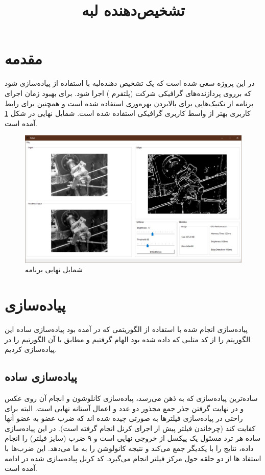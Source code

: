 \documentclass{article}
\title{تشخیص‌دهنده لبه}
\begin{document}
\heading
\header
\allowdisplaybreaks

\tableofcontents
\pagebreak

\section{مقدمه}
در این پروژه سعی شده است که یک تشخیص دهنده‌لبه
با استفاده از  پیاده‌سازی شود که برروی پردازنده‌های گرافیکی شرکت
 (پلتفرم ) اجرا شود.
برای بهبود زمان اجرای برنامه از تکنیک‌هایی برای بالابردن بهره‌وری استفاده شده است و همچنین
برای رابط کاربری بهتر از واسط کاربری گرافیکی استفاده‌ شده است.
شمایل نهایی در شکل \ref{fig:final} آمده است.

\begin{figure}
	\centering
	\includegraphics[scale=0.4]{./resources/final.jpg}
	\caption{شمایل نهایی برنامه}
	\label{fig:final}
\end{figure}

\section{پیاده‌سازی}
پیاده‌سازی انجام شده با استفاده از الگوریتمی که در 
\textcolor{cyan}{\href{https://en.wikipedia.org/wiki/Sobel_operator}{}}
آمده بود پیاده‌سازی ساده این الگوریتم را از کد متلبی که داده شده بود الهام گرفتیم و مطابق با آن الگورتیم را در  پیاده‌سازی کردیم.

\subsection{پیاده‌سازی ساده}
ساده‌ترین پیاده‌سازی که به ذهن می‌رسد، پیاده‌سازی کانلوشون و انجام آن روی عکس و در نهایت گرفتن جذر جمع مجذور دو عدد و اعمال آستانه نهایی است. البته برای راحتی در پیاده‌سازی فیلترها به صورتی چیده شده اند که ضرب عضو به عضو آنها کفایت کند (چرخاندن فیلتر پیش از اجرای کرنل انجام گرفته است). در این پیاده‌سازی ساده هر ترد مسئول یک پیکسل از خروجی نهایی است و ۹ ضرب (سایز فیلتر) را انجام داده، نتایج را با یکدیگر جمع می‌کند و نتیجه کانولوشن را به ما می‌دهد. این ضرب‌ها با استفاد ها از دو حلقه حول مرکز فیلتر انجام می‌گیرد.
کد کرنل پیاده‌سازی شده در ادامه آمده است.
\end{document}
